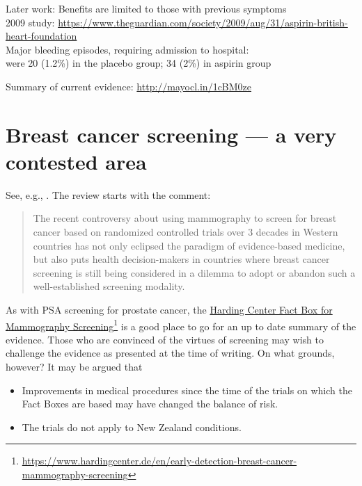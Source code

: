 \documentclass[
  10pt,
  b5paper]{book}
\providecommand{\tightlist}{%
  \setlength{\itemsep}{0pt}\setlength{\parskip}{0pt}}
\begin{document}
Later work: Benefits are limited to those with previous symptoms\\
2009 study: \url{https://www.theguardian.com/society/2009/aug/31/aspirin-british-heart-foundation}\\
Major bleeding episodes, requiring admission to hospital:\\
were 20 (1.2\%) in the placebo group; 34 (2\%) in aspirin group

Summary of current evidence: \url{http://mayocl.in/1cBM0ze}

\hypertarget{breast-cancer-screening-a-very-contested-area}{%
\section{Breast cancer screening --- a very contested area}\label{breast-cancer-screening-a-very-contested-area}}

See, e.g., \citet{raichand2017conclusions}. The review starts with the comment:

\begin{quote}
The recent controversy about using mammography to screen for breast cancer based on randomized controlled trials over 3 decades in Western countries has not only eclipsed the paradigm of evidence-based medicine, but also puts health decision-makers in countries where breast cancer screening is still being considered in a dilemma to adopt or abandon such a well-established screening modality.
\end{quote}

As with PSA screening for prostate cancer, the
\href{https://www.hardingcenter.de/en/early-detection-breast-cancer-mammography-screening}{Harding Center Fact Box for Mammography Screening}\footnote{\url{https://www.hardingcenter.de/en/early-detection-breast-cancer-mammography-screening}} is a good place to go for
an up to date summary of the evidence. Those who are convinced of
the virtues of screening may wish to challenge the evidence as presented
at the time of writing. On what grounds, however? It may be argued
that

\begin{itemize}
\tightlist
\item
  Improvements in medical procedures since the time of the trials
  on which the Fact Boxes are based may have changed the balance of
  risk.
\item
  The trials do not apply to New Zealand conditions.
\end{itemize}
\end{document}
